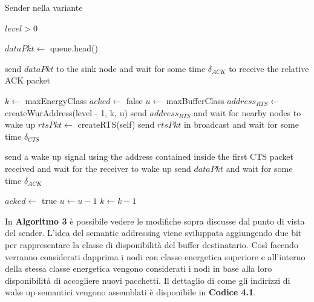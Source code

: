 \documentclass[binding=0.6cm,TFA]{sapthesis}
\begin{document}
\begin{algorithm}
    \caption{Sender nella variante}
    \begin{algorithmic}
        \REQUIRE $level > 0$

            \STATE $dataPkt \leftarrow$ queue.head()

                \STATE send $dataPkt$ to the sink node and wait for some time $\delta_{ACK}$ to receive the relative ACK packet

            \ELSE
                \STATE $k \leftarrow$ maxEnergyClass
                \STATE $acked \leftarrow$ false
                    \STATE $u \leftarrow$ maxBufferClass
                        \STATE $address_{RTS} \leftarrow$ createWurAddress(level - 1, k, u)
                        \STATE send $address_{RTS}$ and wait for nearby nodes to wake up
                        \STATE $rtsPkt \leftarrow$ createRTS(self)
                        \STATE send $rtsPkt$ in broadcast and wait for some time $\delta_{CTS}$
                        
                            \STATE send a wake up signal using the address contained inside the first CTS packet received and wait for the receiver to wake up
                            \STATE send $dataPkt$ and wait for some time $\delta_{ACK}$

                                \STATE $acked \leftarrow$ true
                            \ENDIF
                        \ENDIF
                        \STATE $u \leftarrow u-1$
                    \ENDWHILE
                    \STATE $k \leftarrow k-1$
                \ENDWHILE
            \ENDIF
        
        \ENDWHILE
    \end{algorithmic}
\end{algorithm}

In \textbf{Algoritmo 3} è possibile vedere le modifiche sopra discusse dal punto di vista del sender. L'idea del semantic addressing viene sviluppata
aggiungendo due bit per rappresentare la classe di disponibilità del buffer destinatario. Così facendo verranno considerati dapprima i nodi con classe
energetica superiore e all'interno della stessa classe energetica vengono considerati i nodi in base alla loro disponibilità di accogliere nuovi
pacchetti. Il dettaglio di come gli indirizzi di wake up semantici vengono assemblati è disponibile in \textbf{Codice 4.1}.
\end{document}

